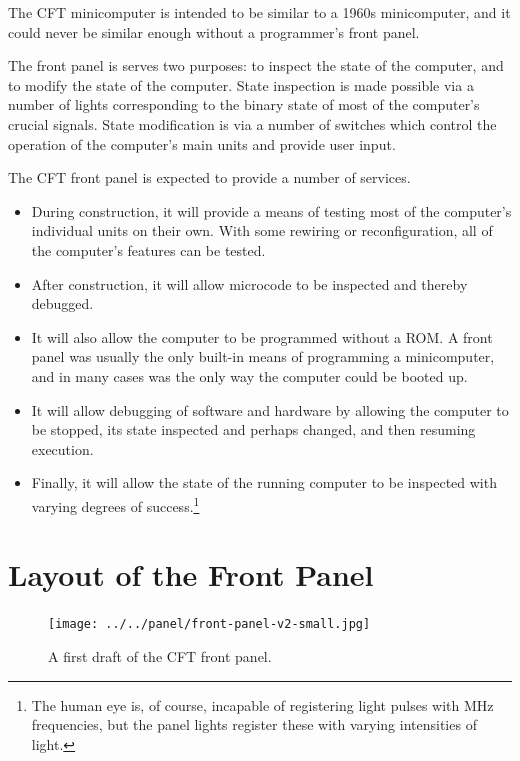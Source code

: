 \documentclass[11pt,a4paper,twocolumns]{article}
\begin{document}
The CFT minicomputer is intended to be similar to a 1960s
minicomputer, and it could never be similar enough without a
programmer's front panel.

The front panel is serves two purposes: to inspect the state of the
computer, and to modify the state of the computer. State inspection is
made possible via a number of lights corresponding to the binary state
of most of the computer's crucial signals. State modification is via a
number of switches which control the operation of the computer's main
units and provide user input.

The CFT front panel is expected to provide a number of services.

\begin{itemize}
\item During construction, it will provide a means of testing most of
  the computer's individual units on their own. With some rewiring or
  reconfiguration, all of the computer's features can be tested.

\item After construction, it will allow microcode to be inspected and
  thereby debugged.

\item It will also allow the computer to be programmed without a
  ROM. A front panel was usually the only built-in means of
  programming a minicomputer, and in many cases was the only way the
  computer could be booted up.

\item It will allow debugging of software and hardware by allowing the
  computer to be stopped, its state inspected and perhaps changed, and
  then resuming execution.

\item Finally, it will allow the state of the running computer to be
  inspected with varying degrees of success.\footnote{The human eye
    is, of course, incapable of registering light pulses with MHz
    frequencies, but the panel lights register these with varying
    intensities of light.}

\end{itemize}

\section{Layout of the Front Panel}

\begin{figure}[t]
\centering
\texttt{[image: ../../panel/front-panel-v2-small.jpg]}\\
\caption{\label{fig-panel}A first draft of the CFT front panel.}
\end{figure}
\end{document}
